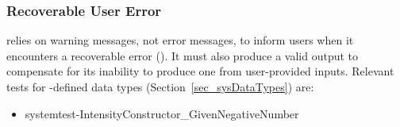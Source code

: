 \subsubsection{Recoverable User Error}\label{sec:sys-nf-recover}
\progname{} relies on warning messages, not error messages, to inform users
when it encounters a recoverable error (). It must also
produce a valid output to compensate for its inability to produce one from
user-provided inputs. %
Relevant tests for \progname{}-defined data types
(Section~\ref{sec_sysDataTypes}) are:
\begin{itemize}
    \item systemtest-IntensityConstructor\_GivenNegativeNumber
\end{itemize}

